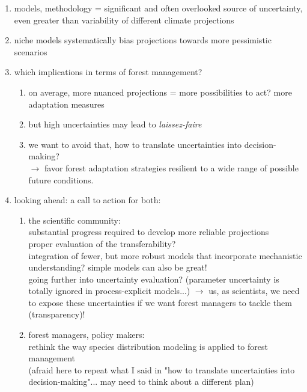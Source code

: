\documentclass[11pt,letter]{article}
\begin{document}
\begin{enumerate}
	
\item models, methodology = significant and often overlooked source of uncertainty, even greater than variability of different climate projections

\item niche models systematically bias projections towards more pessimistic scenarios

\item which implications in terms  of forest management? 
\begin{enumerate}
\item on average, more nuanced projections = more possibilities to act? more adaptation measures
\item but high uncertainties may lead to \emph{laissez-faire}
\item we want to avoid that, how to translate uncertainties into decision-making?\\
$\rightarrow$ favor forest adaptation strategies resilient to a wide range of possible future conditions.
\end{enumerate}

\item looking ahead: a call to action for both:
\begin{enumerate}
	\item the scientific community:\\
	substantial progress required to develop more reliable projections\\
	proper evaluation of the transferability?\\
	integration of fewer, but more robust models that incorporate mechanistic understanding? simple models can also be great!\\
	going further into uncertainty evaluation? (parameter uncertainty is totally ignored in process-explicit models...)
	$\rightarrow$ us, as scientists, we need to expose these uncertainties if we want forest managers to tackle them (transparency)!
	\item forest managers, policy makers:\\
	rethink the way species distribution modeling is applied to forest management\\
	(afraid here to repeat what I said in "how to translate uncertainties into decision-making"... may need to think about a different plan)
\end{enumerate}








\end{enumerate}
\end{document}
